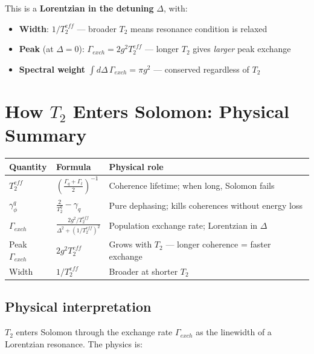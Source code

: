 \documentclass[12pt,a4paper]{article}
\newcommand{\D}{\Delta}
\begin{document}
This is a \textbf{Lorentzian in the detuning} $\D$, with:
\begin{itemize}
    \item \textbf{Width}: $1/T_2^{eff}$ — broader $T_2$ means
          resonance condition is relaxed
    \item \textbf{Peak} (at $\D=0$): $\Gamma_{exch} = 2g^2 T_2^{eff}$
          — longer $T_2$ gives \emph{larger} peak exchange
    \item \textbf{Spectral weight} $\int d\D\,\Gamma_{exch} = \pi g^2$
          — conserved regardless of $T_2$
\end{itemize}

\section{How $T_2$ Enters Solomon: Physical Summary}

\begin{table}[h!]
\centering
\renewcommand{\arraystretch}{1.5}
\begin{tabular}{lll}
\toprule
Quantity & Formula & Physical role \\
\midrule
$T_2^{eff}$ & $\left(\frac{\Gamma_q+\Gamma_t}{2}\right)^{-1}$ &
    Coherence lifetime; when long, Solomon fails \\
$\gamma_\phi^q$ & $\frac{2}{T_2^q} - \gamma_q$ &
    Pure dephasing; kills coherences without energy loss \\
$\Gamma_{exch}$ & $\frac{2g^2/T_2^{eff}}{\D^2 + (1/T_2^{eff})^2}$ &
    Population exchange rate; Lorentzian in $\D$ \\
Peak $\Gamma_{exch}$ & $2g^2 T_2^{eff}$ &
    Grows with $T_2$ — longer coherence = faster exchange \\
Width & $1/T_2^{eff}$ & Broader at shorter $T_2$ \\
\bottomrule
\end{tabular}
\end{table}

\subsection{Physical interpretation}

$T_2$ enters Solomon through the exchange rate $\Gamma_{exch}$ as the
linewidth of a Lorentzian resonance. The physics is:
\end{document}
